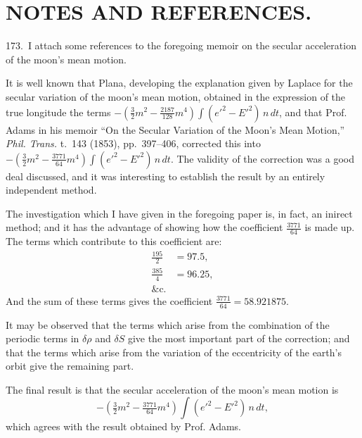 \documentclass[11pt,a4paper]{book}
\providecommand{\mypar}{\par}
\begin{document}
\clearpage


\section*{NOTES AND REFERENCES.}

\medskip

\mypar
173.~I attach some references to the foregoing memoir on the secular
acceleration of the moon's mean motion.

\mypar
It is well known that Plana, developing the explanation given by Laplace for
the secular variation of the moon's mean motion, obtained in the expression of
the true longitude the terms $-\left(\frac{3}{2}m^2 - \frac{2187}{128}m^4\right)\int(e'^2 - E'^2)\,n\,dt$,
and that Prof. Adams in his memoir ``On the Secular Variation of the Moon's Mean
Motion,'' \textit{Phil. Trans.} t.~143 (1853), pp.~397--406, corrected this into
$-\left(\frac{3}{2}m^2 - \frac{3771}{64}m^4\right)\int(e'^2 - E'^2)\,n\,dt$.
The validity of the correction was a good deal discussed, and it was interesting
to establish the result by an entirely independent method.

\mypar
The investigation which I have given in the foregoing paper is, in fact, an
inirect method; and it has the advantage of showing how the coefficient
$\frac{3771}{64}$ is made up. The terms which contribute to this coefficient are:
\begin{align*}
\tfrac{195}{2} &= 97.5,\\
\tfrac{385}{4} &= 96.25,\\
\&\mathrm{c}.
\end{align*}
And the sum of these terms gives the coefficient $\frac{3771}{64} = 58.921875$.

\mypar
It may be observed that the terms which arise from the combination of the
periodic terms in $\delta\rho$ and $\delta S$ give the most important part of the
correction; and that the terms which arise from the variation of the
eccentricity of the earth's orbit give the remaining part.

\mypar
The final result is that the secular acceleration of the moon's mean motion is
\[
-\left(\tfrac{3}{2}m^2 - \tfrac{3771}{64}m^4\right)\int(e'^2 - E'^2)\,n\,dt,
\]
which agrees with the result obtained by Prof. Adams.
\end{document}
